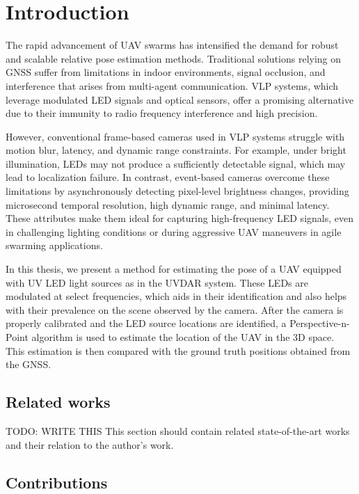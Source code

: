 
\chapter{Introduction\label{chap:introduction}}

The rapid advancement of \ac{UAV} swarms has intensified the demand for robust and scalable relative pose estimation methods.
Traditional solutions relying on \ac{GNSS} suffer from limitations in indoor environments, signal occlusion, and interference that arises from
multi-agent communication.
\ac{VLP} systems, which leverage modulated \ac{LED} signals and optical sensors, offer a promising alternative due to their immunity to radio
frequency interference and high precision.

However, conventional frame-based cameras used in \ac{VLP} systems struggle with motion blur, latency,
and dynamic range constraints. For example, under bright illumination, \ac{LED}s may not produce a sufficiently detectable signal,
which may lead to localization failure. In contrast, event-based cameras overcome these limitations by asynchronously detecting pixel-level
brightness changes, providing microsecond temporal resolution, high dynamic range, and minimal latency. These attributes make them ideal for
capturing high-frequency LED signals, even in challenging lighting conditions or during aggressive \ac{UAV} maneuvers in agile swarming applications.

In this thesis, we present a method for estimating the pose of a \ac{UAV} equipped with \ac{UV} \ac{LED} light sources as in the UVDAR system. \cite{walteruvdar}
These \ac{LED}s are modulated at select frequencies, which aids in their identification and also helps with their prevalence
on the scene observed by the camera. After the camera is properly calibrated and the LED source locations are identified, a Perspective-n-Point 
algorithm is used to estimate the location of the \ac{UAV} in the 3D space. This estimation is then compared with the ground truth positions obtained
from the \ac{GNSS}.

\section{Related works}
TODO: WRITE THIS
This section should contain related state-of-the-art works and their relation to the author's work.

\section{Contributions}

